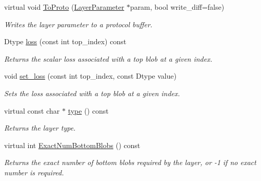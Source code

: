 \begin{DoxyCompactItemize}
\mbox{\label{classcaffe_1_1_layer_ab2badafa974783cee8ecc8f666769a0e}} 
virtual void \mbox{\hyperlink{classcaffe_1_1_layer_ab2badafa974783cee8ecc8f666769a0e}{To\+Proto}} (\mbox{\hyperlink{classcaffe_1_1_layer_parameter}{Layer\+Parameter}} $\ast$param, bool write\+\_\+diff=false)
\begin{DoxyCompactList}\small\item\em Writes the layer parameter to a protocol buffer. \end{DoxyCompactList}\item 
\mbox{\label{classcaffe_1_1_layer_a899410336f30821644c8bd6c69a070c9}} 
Dtype \mbox{\hyperlink{classcaffe_1_1_layer_a899410336f30821644c8bd6c69a070c9}{loss}} (const int top\+\_\+index) const
\begin{DoxyCompactList}\small\item\em Returns the scalar loss associated with a top blob at a given index. \end{DoxyCompactList}\item 
\mbox{\label{classcaffe_1_1_layer_a899b09f4b91ada8545b3a43ee91e0d69}} 
void \mbox{\hyperlink{classcaffe_1_1_layer_a899b09f4b91ada8545b3a43ee91e0d69}{set\+\_\+loss}} (const int top\+\_\+index, const Dtype value)
\begin{DoxyCompactList}\small\item\em Sets the loss associated with a top blob at a given index. \end{DoxyCompactList}\item 
\mbox{\label{classcaffe_1_1_layer_a8952bff6bc4c2a96d8ea30d8ff65b198}} 
virtual const char $\ast$ \mbox{\hyperlink{classcaffe_1_1_layer_a8952bff6bc4c2a96d8ea30d8ff65b198}{type}} () const
\begin{DoxyCompactList}\small\item\em Returns the layer type. \end{DoxyCompactList}\item 
virtual int \mbox{\hyperlink{classcaffe_1_1_layer_a8e5ee0494d85f5f55fc4396537cbc60f}{Exact\+Num\+Bottom\+Blobs}} () const
\begin{DoxyCompactList}\small\item\em Returns the exact number of bottom blobs required by the layer, or -\/1 if no exact number is required. \end{DoxyCompactList}\item 

\end{DoxyCompactItemize}
